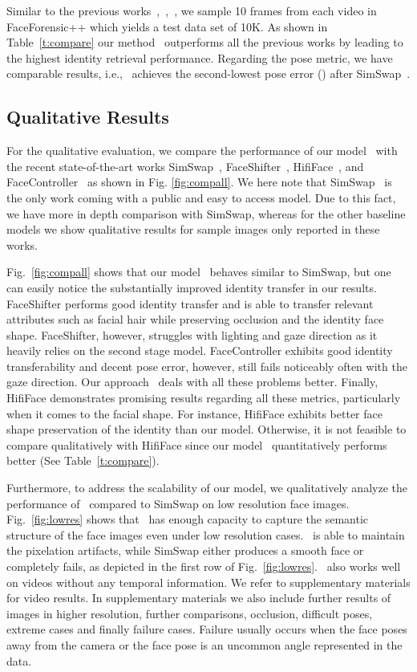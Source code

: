 \documentclass[10pt,twocolumn,letterpaper]{article}
\newcommand{\fti}[1]{\textit{FaceDancer}{#1}}
\begin{document}
Similar to the previous works~\cite{faceshifter},~\cite{simswap},~\cite{hififace}, we sample 10 frames from each video in FaceForensic++ which yields a test data set of 10K. 
As shown in Table~\ref{t:compare} our method \fti~outperforms all the previous works by leading to the highest  identity retrieval performance. Regarding the pose metric, we have comparable results, i.e., \fti~achieves  the second-lowest pose error () after SimSwap~\cite{simswap}.


\subsection{Qualitative Results}


For the qualitative evaluation,  we compare the performance of our model \fti~with the recent state-of-the-art works SimSwap~\cite{simswap}, FaceShifter~\cite{faceshifter}, HifiFace~\cite{hififace}, and FaceController~\cite{facecontroller} as shown in Fig. \ref{fig:compall}.
We here note that SimSwap~\cite{simswap} is the only work coming with a public and easy to access model. Due to this fact,  we   have more in depth comparison with SimSwap, whereas for the other baseline models we show qualitative results for sample images only reported in these works. 


Fig.~\ref{fig:compall} shows that our model \fti~behaves similar to  SimSwap, but one can easily notice the substantially improved identity transfer in our results. 
FaceShifter performs good identity transfer and is able to transfer relevant attributes such as facial hair while preserving occlusion and the identity face shape. 
FaceShifter, however, struggles with lighting and gaze direction as it heavily relies on the second stage model. FaceController exhibits good identity transferability and decent pose error, however, still fails noticeably often with the gaze direction. 
Our approach \fti~deals with all these problems better. Finally, HifiFace demonstrates promising results regarding all these metrics, particularly when it comes to the facial shape. For instance, HifiFace exhibits better face shape preservation of the identity than our model. Otherwise, it is not feasible to compare qualitatively with HifiFace since our model \fti~quantitatively performs better (See Table~\ref{t:compare}).

Furthermore, to address the scalability of our model, we qualitatively analyze the performance of \fti~compared to SimSwap on low resolution face images. 
Fig.~\ref{fig:lowres} shows that \fti~has enough capacity to capture the semantic structure of the face images  even under low resolution cases. 
\fti~is able to maintain the pixelation artifacts, while SimSwap either produces a smooth face or completely fails, as depicted in the first row of Fig.~\ref{fig:lowres}. \fti~also works well on videos without any temporal information. We refer to supplementary materials for video results. In supplementary materials we also include further results of images in higher resolution, further comparisons, occlusion, difficult poses, extreme cases and finally failure cases. Failure usually occurs when the face poses away from the camera or the face pose is an uncommon angle represented in the data.
\end{document}
